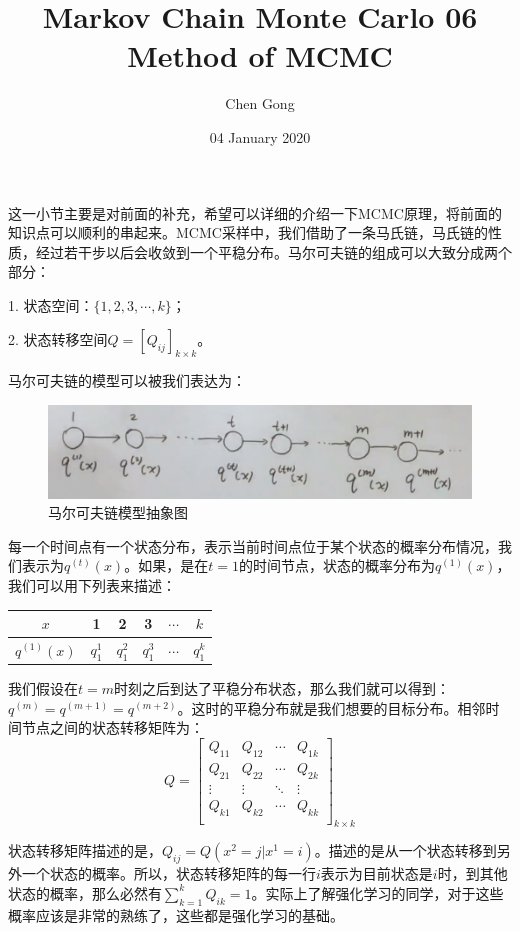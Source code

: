 \documentclass[a4paper]{article}
\title{Markov Chain Monte Carlo 06 Method of MCMC}
\author{Chen Gong}
\date{04 January 2020}
\begin{document}
\maketitle
这一小节主要是对前面的补充，希望可以详细的介绍一下MCMC原理，将前面的知识点可以顺利的串起来。MCMC采样中，我们借助了一条马氏链，马氏链的性质，经过若干步以后会收敛到一个平稳分布。马尔可夫链的组成可以大致分成两个部分：

1. 状态空间：$\{ 1,2,3,\cdots,k \}$；

2. 状态转移空间$Q=[Q_{ij}]_{k\times k}$。

马尔可夫链的模型可以被我们表达为：
\begin{figure}[H]
    \centering
    \includegraphics[width=.55\textwidth]{微信图片_20200103121212.png}
    \caption{马尔可夫链模型抽象图}
    \label{fig:my_label_1}
\end{figure}

每一个时间点有一个状态分布，表示当前时间点位于某个状态的概率分布情况，我们表示为$q^{(t)}(x)$。如果，是在$t=1$的时间节点，状态的概率分布为$q^{(1)}(x)$，我们可以用下列表来描述：
\begin{center}
\begin{tabular}{c|ccccc}
     $x$ & 1 & 2 & 3 & $\cdots$ & $k$  \\
     \hline
     $q^{(1)}(x)$& $q_1^1$ & $q_1^2$ & $q_1^3$ & $\cdots$ & $q_1^k$ \\
\end{tabular}    
\end{center}

我们假设在$t=m$时刻之后到达了平稳分布状态，那么我们就可以得到：$q^{(m)} = q^{(m+1)} = q^{(m+2)}$。这时的平稳分布就是我们想要的目标分布。相邻时间节点之间的状态转移矩阵为：
\begin{equation}
    Q =
    \begin{bmatrix}
        Q_{11} & Q_{12} & \cdots & Q_{1k} \\
        Q_{21} & Q_{22} & \cdots & Q_{2k} \\
        \vdots & \vdots & \ddots & \vdots \\
        Q_{k1} & Q_{k2} & \cdots & Q_{kk} \\
    \end{bmatrix}_{k\times k}
\end{equation}

状态转移矩阵描述的是，$Q_{ij} = Q(x^2=j|x^1=i)$。描述的是从一个状态转移到另外一个状态的概率。所以，状态转移矩阵的每一行$i$表示为目前状态是$i$时，到其他状态的概率，那么必然有$\sum_{k=1}^k Q_{ik} = 1$。实际上了解强化学习的同学，对于这些概率应该是非常的熟练了，这些都是强化学习的基础。
\end{document}

